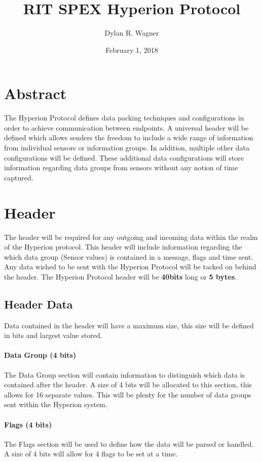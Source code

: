 \documentclass{article}
\title{RIT SPEX Hyperion Protocol}
\date{February 1, 2018}
\author{Dylan R. Wagner}
\begin{document}
  \maketitle
  
  \section{Abstract}
  The Hyperion Protocol defines data packing techniques and configurations in order to achieve communication between endpoints. A universal header will be defined which allows senders the freedom to include a wide range of information from individual sensors or information groups. In addition, multiple other data configurations will be defined. These additional data configurations will store information regarding data groups from sensors without any notion of time captured.
  
  \section{Header}
  The header will be required for any outgoing and incoming data within the realm of the Hyperion protocol. This header will include information regarding the which data group (Sensor values) is contained in a message, flags and time sent. Any data wished to be sent with the Hyperion Protocol will be tacked on behind the header.  The Hyperion Protocol header will be \textbf{40bits} long or \textbf{5 bytes}.
  \subsection{Header Data}
  Data contained in the header will have a maximum size, this size will be defined in bits and largest value stored. 
  
  \paragraph{Data Group (4 bits)}
  The Data Group section will contain information to distinguish which data is contained after the header. A size of 4 bits will be allocated to this section, this allows for 16 separate values. This will be plenty for the number of data groups sent within the Hyperion system. 
  
  \paragraph{Flags (4 bits)}
  The Flags section will be used to define how the data will be parsed or handled. A size of 4 bits will allow for 4 flags to be set at a time.
  
\end{document}
